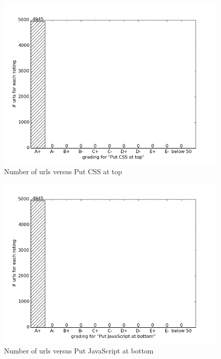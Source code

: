 \documentclass[conference]{IEEEtran}
\begin{document}
\begin{figure}[ht]
 \centering
  \includegraphics[scale=0.33]{new-img-jpg/vlab-jpg/Put CSS at top.jpg}
\caption{Number of urls versus Put CSS at top}
\label{fig:cssattop}
\end{figure}

\begin{figure}[ht]
 \centering
  \includegraphics[scale=0.33]{img/vlab+/Put JavaScript at bottom.jpg}
\caption{Number of urls versus Put JavaScript at bottom}	
\label{fig:jsatbottom}
\end{figure}
           
\end{document}
